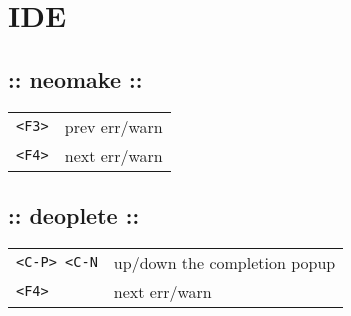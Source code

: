 \section{\hrulefill IDE\hrulefill}
\subsection{:: neomake ::}
\begin{tabular}{@{}ll@{}}
    \verb!<F3>!     & prev err/warn \\
    \verb!<F4>!     & next err/warn \\
\end{tabular}

\subsection{:: deoplete ::}
\begin{tabular}{@{}ll@{}}
    \verb!<C-P> <C-N!   & up/down the completion popup \\
    \verb!<F4>!     & next err/warn \\
\end{tabular}
